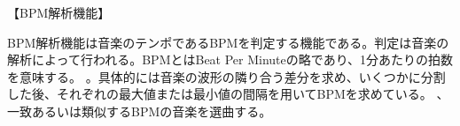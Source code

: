 【BPM解析機能】
\par
BPM解析機能は音楽のテンポであるBPMを判定する機能である。判定は音楽の解析によって行われる。BPMとはBeat Per Minuteの略であり、1分あたりの拍数を意味する。
。具体的には音楽の波形の隣り合う差分を求め、いくつかに分割した後、それぞれの最大値または最小値の間隔を用いてBPMを求めている。
、一致あるいは類似するBPMの音楽を選曲する。
